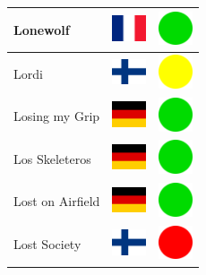 \documentclass[12pt, a4paper, twoside]{report}
\begin{document}
\begin{center}
\begin{longtable}{|p{5cm}|p{2cm}|p{2cm}|}
Lonewolf & \includegraphics[width=1cm]{4x3/fr} & \includegraphics[width=1cm]{likes/y} \\ \hline
Lordi & \includegraphics[width=1cm]{4x3/fi} & \includegraphics[width=1cm]{likes/m} \\ \hline
Losing my Grip & \includegraphics[width=1cm]{4x3/de} & \includegraphics[width=1cm]{likes/y} \\ \hline
Los Skeleteros & \includegraphics[width=1cm]{4x3/de} & \includegraphics[width=1cm]{likes/y} \\ \hline
Lost on Airfield & \includegraphics[width=1cm]{4x3/de} & \includegraphics[width=1cm]{likes/y} \\ \hline
Lost Society & \includegraphics[width=1cm]{4x3/fi} & \includegraphics[width=1cm]{likes/n} \\ \hline

\end{longtable}
\end{center}
\end{document}

